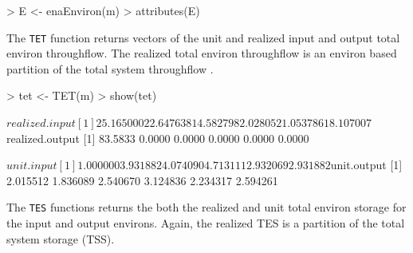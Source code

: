 \documentclass[article]{jss}
\begin{document}
\begin{Schunk}
\begin{Sinput}
> E <- enaEnviron(m)
> attributes(E)
\end{Sinput}
\end{Schunk}

The \texttt{TET} function returns vectors of the unit and realized
input and output total environ throughflow.  The realized total
environ throughflow is an environ based partition of the total system
throughflow \citep{whipple07}.

\begin{Schunk}
\begin{Sinput}
> tet <- TET(m)
> show(tet)
\end{Sinput}
\begin{Soutput}
$realized.input
[1] 25.165000 22.647638 14.582798  2.028052  1.053786 18.107007

$realized.output
[1] 83.5833  0.0000  0.0000  0.0000  0.0000  0.0000

$unit.input
[1] 1.000000 3.931882 4.074090 4.713111 2.932069 2.931882

$unit.output
[1] 2.015512 1.836089 2.540670 3.124836 2.234317 2.594261
\end{Soutput}
\end{Schunk}

The \texttt{TES} functions returns the both the realized and unit
total environ storage for the input and output environs.  Again, the
realized TES is a partition of the total system storage (TSS).
\end{document}
